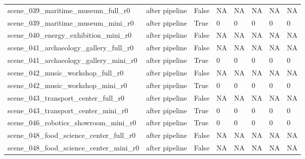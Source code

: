 \begin{tabular}{llllllll}
scene\_039\_maritime\_museum\_full\_r0 & after pipeline & False & NA & NA & NA & NA & NA \\
scene\_039\_maritime\_museum\_mini\_r0 & after pipeline & True & 0 & 0 & 0 & 0 & 0 \\
scene\_040\_energy\_exhibition\_mini\_r0 & after pipeline & False & NA & NA & NA & NA & NA \\
scene\_041\_archaeology\_gallery\_full\_r0 & after pipeline & False & NA & NA & NA & NA & NA \\
scene\_041\_archaeology\_gallery\_mini\_r0 & after pipeline & True & 0 & 0 & 0 & 0 & 0 \\
scene\_042\_music\_workshop\_full\_r0 & after pipeline & False & NA & NA & NA & NA & NA \\
scene\_042\_music\_workshop\_mini\_r0 & after pipeline & True & 0 & 0 & 0 & 0 & 0 \\
scene\_043\_transport\_center\_full\_r0 & after pipeline & False & NA & NA & NA & NA & NA \\
scene\_043\_transport\_center\_mini\_r0 & after pipeline & True & 0 & 0 & 0 & 0 & 0 \\
scene\_046\_robotics\_showroom\_mini\_r0 & after pipeline & True & 0 & 0 & 0 & 0 & 0 \\
scene\_048\_food\_science\_center\_full\_r0 & after pipeline & False & NA & NA & NA & NA & NA \\
scene\_048\_food\_science\_center\_mini\_r0 & after pipeline & False & NA & NA & NA & NA & NA \\
\bottomrule
\end{tabular}

